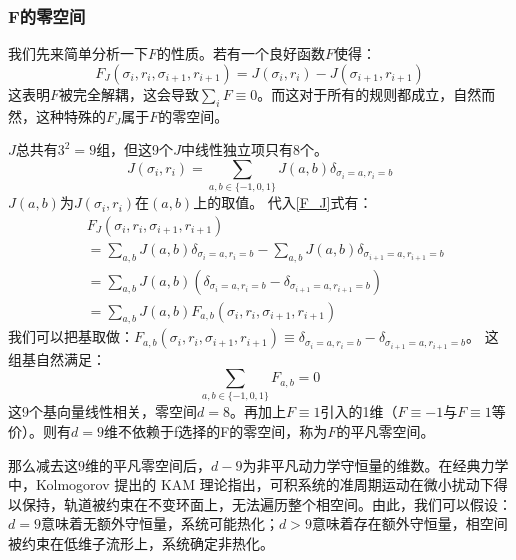 \documentclass[reprint, amsmath, amssymb, aps, physrev,prb]{revtex4-2}
\begin{document}
\subsubsection{F的零空间}
我们先来简单分析一下$F$的性质。若有一个良好函数$F$使得：
\begin{equation}
    F_J (\sigma_i , r_i , \sigma_{i+1} , r_{i+1}) = J(\sigma_i , r_i) - J(\sigma_{i+1} , r_{i+1})
    \label{F_J}
\end{equation}
这表明$F$被完全解耦，这会导致$\sum_i F \equiv 0$。而这对于所有的规则都成立，自然而然，这种特殊的$F_J$属于$F$的零空间。

$J$总共有$3^2=9$组，但这9个$J$中线性独立项只有8个。
\begin{equation}
    J(\sigma_i , r_i) = \sum_{a , b \in \{-1 ,0 ,1\}} J(a , b)\delta_{\sigma_i = a , r_i = b}
\end{equation}
$J(a,b)$为$J(\sigma_i , r_i)$在$(a,b)$上的取值。
代入\ref{F_J}式有：
\begin{equation}
    \begin{aligned}
            & F_J (\sigma_i , r_i , \sigma_{i+1} , r_{i+1}) \\
            & = \sum_{a , b } J(a , b) \delta_{\sigma_i = a , r_i = b} - \sum_{a , b} J(a , b)\delta_{\sigma_{i+1} = a , r_{i+1} = b} \\
            & = \sum_{a , b } J(a , b) (\delta_{\sigma_i = a , r_i = b}-\delta_{\sigma_{i+1} = a , r_{i+1} = b}) \\
            & = \sum_{a , b } J(a , b) F_{a,b}(\sigma_i , r_i , \sigma_{i+1} , r_{i+1})
    \end{aligned}
\end{equation}
我们可以把基取做：$F_{a,b}(\sigma_i , r_i , \sigma_{i+1} , r_{i+1})\equiv \delta_{\sigma_i = a , r_i = b}-\delta_{\sigma_{i+1} = a , r_{i+1} = b}$。
这组基自然满足：
\begin{equation}
    \sum_{a,b \in \{-1 ,0 ,1\}}F_{a,b} = 0
\end{equation}
这9个基向量线性相关，零空间$d=8$。再加上$F\equiv 1$引入的1维（$F\equiv -1$与$F\equiv 1$等价）。则有$d=9$维不依赖于f选择的F的零空间，称为$F$的平凡零空间。

那么减去这9维的平凡零空间后，$d-9$为非平凡动力学守恒量的维数。在经典力学中，Kolmogorov \cite{BFb0021737}提出的 KAM 理论指出，可积系统的准周期运动在微小扰动下得以保持，轨道被约束在不变环面上，无法遍历整个相空间。由此，我们可以假设：
$d = 9$意味着无额外守恒量，系统可能热化；$d > 9$意味着存在额外守恒量，相空间被约束在低维子流形上，系统确定非热化。
\end{document}
